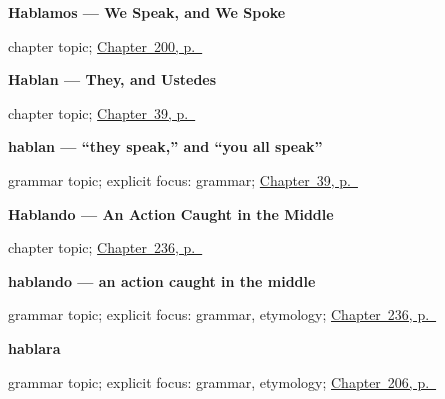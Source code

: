 \noindent\begin{minipage}[t]{\linewidth}
\raggedright
\textbf{Hablamos --- We Speak, and We Spoke}\par
\footnotesize chapter topic; \hyperref[ch:hablamos-dos]{Chapter~200, p.~\pageref*{ch:hablamos-dos}}
\end{minipage}\par\smallskip

\noindent\begin{minipage}[t]{\linewidth}
\raggedright
\textbf{Hablan --- They, and Ustedes}\par
\footnotesize chapter topic; \hyperref[ch:spanish-hablan]{Chapter~39, p.~\pageref*{ch:spanish-hablan}}
\end{minipage}\par\smallskip

\noindent\begin{minipage}[t]{\linewidth}
\raggedright
\textbf{hablan — \textquotedblleft{}they speak,\textquotedblright{} and \textquotedblleft{}you all speak\textquotedblright{}}\par
\footnotesize grammar topic; explicit focus: grammar; \hyperref[ch:spanish-hablan]{Chapter~39, p.~\pageref*{ch:spanish-hablan}}
\end{minipage}\par\smallskip

\noindent\begin{minipage}[t]{\linewidth}
\raggedright
\textbf{Hablando --- An Action Caught in the Middle}\par
\footnotesize chapter topic; \hyperref[ch:hablando]{Chapter~236, p.~\pageref*{ch:hablando}}
\end{minipage}\par\smallskip

\noindent\begin{minipage}[t]{\linewidth}
\raggedright
\textbf{hablando — an action caught in the middle}\par
\footnotesize grammar topic; explicit focus: grammar, etymology; \hyperref[ch:hablando]{Chapter~236, p.~\pageref*{ch:hablando}}
\end{minipage}\par\smallskip

\noindent\begin{minipage}[t]{\linewidth}
\raggedright
\textbf{hablara}\par
\footnotesize grammar topic; explicit focus: grammar, etymology; \hyperref[ch:hablara]{Chapter~206, p.~\pageref*{ch:hablara}}
\end{minipage}\par\smallskip

